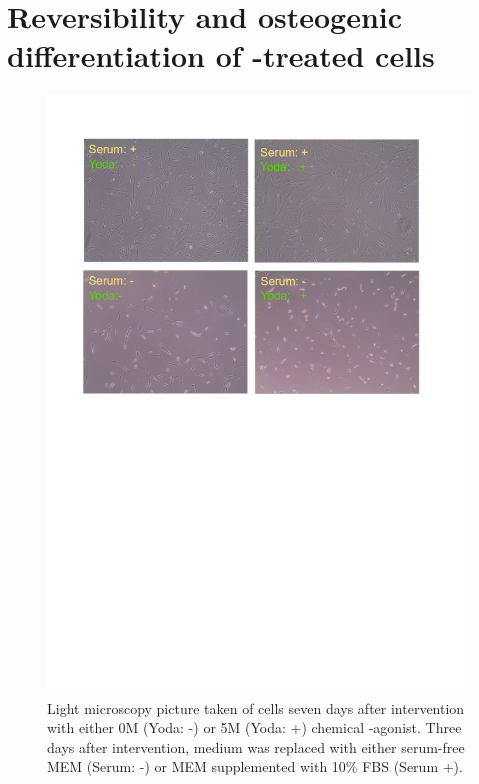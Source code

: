 \section{Reversibility and osteogenic differentiation of \Yoda{}-treated cells}

\begin{figure}[ht]
	\centering
	\includegraphics[width = \linewidth{}]{LongTerm_CellPicture.png}
	\caption{
		Light microscopy picture taken of cells seven days after intervention with either 0\textmu{}M (Yoda: -) or 5\textmu{}M (Yoda: +) chemical \Piezo{}-agonist. Three days after intervention, medium was replaced with either serum-free MEM\textalpha{} (Serum: -) or MEM\textalpha{} supplemented with 10\% FBS (Serum +).}
	\label{pic:Cells_LongTerm}
\end{figure}

